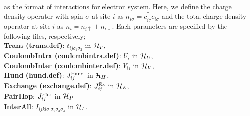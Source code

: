 \begin{description}
\begin{eqnarray}
\end{eqnarray}
as the format of interactions for electron system. Here, we define the charge density operator with spin $\sigma$ at site $i$ as $n_{i \sigma}=c_{i\sigma}^{\dag}c_{i\sigma}$ and the total charge density operator at site $i$ as $n_i=n_{i\uparrow}+n_{i\downarrow}$. 
Each parameters are specified by the following files, respectively;
~\\{\bf Trans (trans.def)}: $t_{ij\sigma_1\sigma_2}$ in ${\cal H}_T$,  
~\\{\bf CoulombIntra (coulombintra.def)}: $U_i$ in ${\cal H}_U$,   
~\\{\bf CoulombInter (coulombinter.def)}: $V_{ij}$ in ${\cal H}_V$,  
~\\{\bf Hund (hund.def)}: $J_{ij}^{\rm Hund}$ in ${\cal H}_H$,  
~\\{\bf Exchange (exchange.def)}: $J_{ij}^{\rm Ex}$ in ${\cal H}_E$,  
~\\{\bf PairHop}: $J_{ij}^{\rm Pair}$ in ${\cal H}_P$, 
~\\{\bf InterAll}: $I_{ijkl\sigma_1\sigma_2\sigma_3\sigma_4}$ in ${\cal H}_I$.


\end{description}
